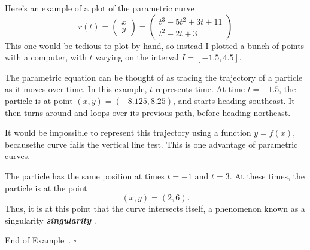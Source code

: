 \documentclass[10pt]{article}
\DeclareRobustCommand{\demph}[1]{%
  \ifmmode
  {\color{Blue}#1}%
  \else
  {\color{Blue}\bfseries\slshape #1}%
  \fi
}
\theoremstyle{definition}
\newtheorem{example}[theorem]{Example}
\renewenvironment{example}
{\begin{oldexample}}
  {\par\smallskip\hfill   End of Example~\theexample. $\square$    \par\end{oldexample}}
\newcommand{\1}[1]{\textbf{1}_{\left[#1\right]}} %
\begin{document}
\begin{example}
  \label{ex:parametric-curve-with-singularity}
  Here's an example of a plot of the parametric curve
  \begin{equation*}
    r(t) =
    \begin{pmatrix}
      x\\y
    \end{pmatrix}=
    \begin{pmatrix}
      t^{3}-5t^{2}+3t+11\\
      t^{2}-2t+3
    \end{pmatrix}
  \end{equation*}
  This one would be tedious to plot by hand, so instead I plotted a bunch of points with a computer, with $t$ varying on
  the interval $I=[-1.5,4.5]$.
  \begin{center}
  \end{center}
  The parametric equation can be thought of as tracing the trajectory of a particle as it moves over time. In this
  example, $t$ represents time. At time $t=-1.5$, the particle is at point $(x,y)= (-8.125,8.25)$, and starts heading
  southeast. It then turns around and loops over its previous path, before heading northeast.

  It would be impossible to represent this trajectory using a function $y=f(x)$, becausethe curve fails the vertical
  line test. This is one advantage of parametric curves.

  The particle has the same position at times $t=-1$ and $t=3$. At these times, the particle is at the point
  \begin{equation*}
    (x,y) = (2,6).  
  \end{equation*}
  Thus, it is at this point that the curve intersects itself, a phenomenon known as a \demph{singularity}.
\end{example}
\end{document}
